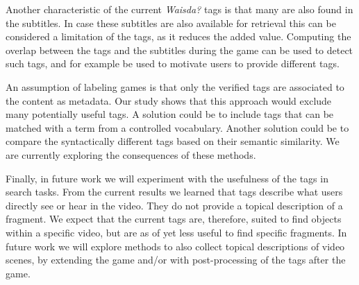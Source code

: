 Another characteristic of the current \emph{Waisda?} tags is that many are
also found in the subtitles. In case these subtitles are also available for
retrieval this can be considered a limitation of the tags, as it reduces the
added value. Computing the overlap between the tags and the subtitles during
the game can be used to detect such tags, and for example be used to motivate
users to provide different tags.

An assumption of labeling games is that only the verified tags are associated
to the content as metadata. Our study shows that this approach would exclude
many potentially useful tags. A solution could be to include tags that can be
matched with a term from a controlled vocabulary. Another solution could be to
compare the syntactically different tags based on their semantic similarity.
We are currently exploring the consequences of these methods.

Finally, in future work we will experiment with the usefulness of the tags in
search tasks. From the current results we learned that tags describe what
users directly see or hear in the video. They do not provide a topical description
of a fragment. We expect that the current tags are, therefore, suited to find
objects within a specific video, but are as of yet less useful to find
specific fragments. In future work we will explore methods to also collect
topical descriptions of video scenes, by extending the game and/or with
post-processing of the tags after the game.
